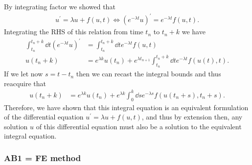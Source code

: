 \documentclass[12pt]{article}
\begin{document}
By integrating factor we showed that 
\begin{align}
    u^{\prime} = \lambda u + f(u, t) \Leftrightarrow \left(e^{-\lambda t}u\right)^{\prime}  = e^{-\lambda t}f(u,t).
\end{align}
Integrating the RHS of this relation from time $t_{n}$ to $t_{n}+k$ we have
\begin{subequations}
    \begin{align}
        \int_{t_{n}}^{t_{n}+k}\dd{t} \left(e^{-\lambda t}u\right)^{\prime}  &= \int_{t_{n}}^{t_{n}+k}\dd{t} e^{-\lambda t}f(u,t)\\
        u(t_{n}+k) &= e^{\lambda k} u(t_{n}) + e^{\lambda t_{n+1}} \int_{t_{n}}^{t_{n}+k}\dd{t} e^{-\lambda t} f(u(t), t).
    \end{align}
\end{subequations}
If we let now $s = t-t_{n}$ then we can recast the integral bounds and thus reacquire that 
\begin{align}
    u(t_{n}+k) &= e^{\lambda k} u(t_{n}) + e^{\lambda k}\int_{0}^{k}\dd{s} e^{-\lambda s} f(u(t_{n}+s), t_{n}+s).
\end{align}
Therefore, we have shown that this integral equation is an equivalent formulation of the differential equation $u^{\prime} = \lambda u + f(u,t)$, and thus by extension then, any solution $u$ of this differential equation must also be a solution to the equivalent integral equation. 

\subsubsection*{AB1 = FE method}
\end{document}
